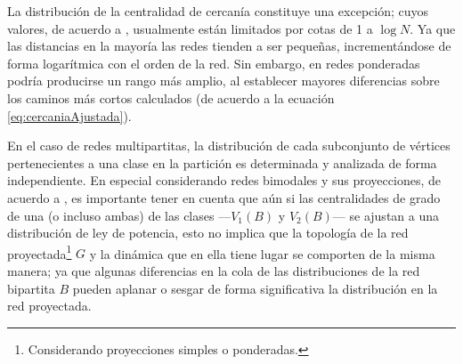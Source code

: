 \documentclass[letterpaper, 11pt]{book}
\theoremstyle{definition}
\theoremstyle{remark}
\begin{document}
La distribución de la centralidad de cercanía constituye una excepción; cuyos valores, de acuerdo a \citet{2010_Newman_Networks}, usualmente están limitados por cotas de 1 a $\log N$. 
Ya que las distancias en la mayoría las redes tienden a ser pequeñas, incrementándose de forma logarítmica con el orden de la red. 
Sin embargo, en redes ponderadas podría producirse un rango más amplio, al establecer mayores diferencias sobre los caminos más cortos calculados (de acuerdo a la ecuación \ref{eq:cercaniaAjustada}).


En el caso de redes multipartitas, la distribución de cada subconjunto de vértices pertenecientes a una clase en la partición es determinada y analizada de forma independiente. 
En especial considerando redes bimodales y sus proyecciones, de acuerdo a \citet{2018_DegreeBipartite_Filho}, es importante tener en cuenta que aún si las centralidades de grado de una (o incluso ambas) de las clases ---$V_{1}(B)$ y $V_{2}(B)$--- se ajustan a una distribución de ley de potencia, esto no implica que la topología de la red proyectada\footnote{
    Considerando proyecciones simples o ponderadas.
} $G$ y la dinámica que en ella tiene lugar se comporten de la misma manera; ya que algunas diferencias en la cola de las distribuciones de la red bipartita $B$ pueden aplanar o sesgar de forma significativa la distribución en la red proyectada.




\end{document}
